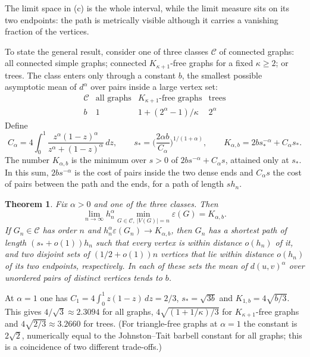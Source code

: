 \documentclass[11pt,a4paper]{article}
\newtheorem{theorem}{Theorem}
\theoremstyle{definition}
\newcommand{\eps}{\varepsilon}
\begin{document}
The limit space in (c) is the whole interval, while the limit measure sits on its two endpoints: the path is metrically visible although it carries a vanishing fraction of the vertices.

To state the general result, consider one of three classes $\mathcal C$ of connected graphs: all connected simple graphs; connected $K_{\kappa+1}$-free graphs for a fixed $\kappa\ge2$; or trees. The class enters only through a constant $b$, the smallest possible asymptotic mean of $d^\alpha$ over pairs inside a large vertex set:
\[
\begin{array}{c|ccc}
\mathcal C & \text{all graphs}&K_{\kappa+1}\text{-free graphs}&\text{trees}\\ \hline
 b &1&1+(2^\alpha-1)/\kappa&2^\alpha
\end{array}
\]
Define
\begin{equation}\label{eq:constants}
 C_\alpha=4\int_0^1\frac{z^\alpha(1-z)^\alpha}{z^\alpha+(1-z)^\alpha}\,dz,\qquad
 s_*=\Big(\frac{2\alpha b}{C_\alpha}\Big)^{1/(1+\alpha)},\qquad
 K_{\alpha,b}=2b s_*^{-\alpha}+C_\alpha s_* .
\end{equation}
The number $K_{\alpha,b}$ is the minimum over $s>0$ of $2bs^{-\alpha}+C_\alpha s$, attained only at $s_*$. In this sum, $2bs^{-\alpha}$ is the cost of pairs inside the two dense ends and $C_\alpha s$ the cost of pairs between the path and the ends, for a path of length $sh_n$.

\begin{theorem}\label{th:main}
Fix $\alpha>0$ and one of the three classes. Then
\[
 \lim_{n\to\infty} h_n^\alpha\min_{G\in\mathcal C,\ |V(G)|=n}\eps(G)=K_{\alpha,b}.
\]
If $G_n\in\mathcal C$ has order $n$ and $h_n^\alpha\eps(G_n)\to K_{\alpha,b}$, then $G_n$ has a shortest path of length $(s_*+o(1))h_n$ such that every vertex is within distance $o(h_n)$ of it, and two disjoint sets of $(1/2+o(1))n$ vertices that lie within distance $o(h_n)$ of its two endpoints, respectively. In each of these sets the mean of $d(u,v)^\alpha$ over unordered pairs of distinct vertices tends to $b$.
\end{theorem}

At $\alpha=1$ one has $C_1=4\int_0^1z(1-z)\,dz=2/3$, $s_*=\sqrt{3b}$ and $K_{1,b}=4\sqrt{b/3}$. This gives $4/\sqrt3\approx2.3094$ for all graphs, $4\sqrt{(1+1/\kappa)/3}$ for $K_{\kappa+1}$-free graphs and $4\sqrt{2/3}\approx3.2660$ for trees. (For triangle-free graphs at $\alpha=1$ the constant is $2\sqrt2$, numerically equal to the Johnston--Tait barbell constant for all graphs; this is a coincidence of two different trade-offs.)
\end{document}
